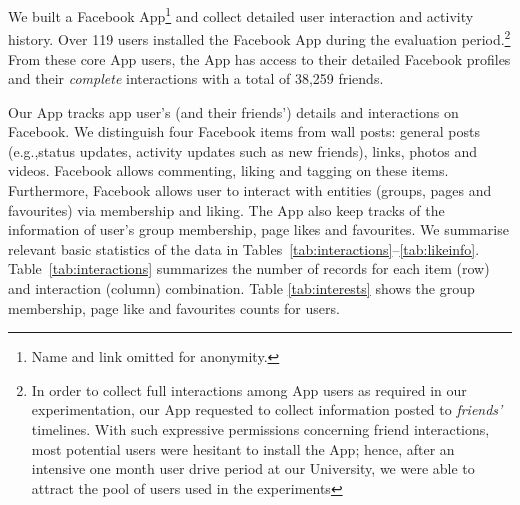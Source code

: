 

We built a Facebook App\footnote{Name and link omitted
for anonymity.} and  collect detailed user interaction and activity history. 
Over 119 users installed the Facebook App during the evaluation
period.\footnote{In order to collect full interactions among App users
as required in our experimentation, our App requested to collect
information posted to \emph{friends'} timelines.  With such expressive
permissions concerning friend interactions, most potential users were
hesitant to install the App; hence, after an intensive one month user drive period
at our University, we were able to attract the pool of users used in the experiments}
From these core App users, the App has access to their detailed
Facebook profiles and their \emph{complete} interactions with a total of 38,259
friends.

Our App tracks app user's (and their friends') details and
interactions on Facebook. We distinguish four Facebook items from wall posts:
general posts (e.g.,status updates, activity updates such as new friends), 
links, photos and videos. Facebook allows commenting, liking and tagging on these items.
Furthermore, Facebook allows user to interact with entities
(groups, pages and favourites) via membership and liking. The App also
keep tracks of the information of user's group membership, page likes
and favourites. We summarise relevant basic statistics of the data in
Tables~\ref{tab:interactions}--\ref{tab:likeinfo}.
Table~\ref{tab:interactions} summarizes the number of records for each
item (row) and interaction (column)
combination. Table \ref{tab:interests} shows the group membership,
page like and favourites counts for users.



